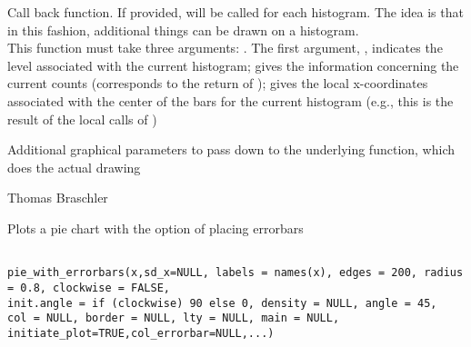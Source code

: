 \documentclass[a4paper]{book}
\begin{document}
\begin{Arguments}
\begin{ldescription}
\item[\code{FUN}] Call back function. If provided, will be called for each histogram. The idea is that in this fashion, additional things can be drawn on a histogram.\\{} This function must take three arguments: . The first argument, , indicates the level associated with the current histogram;  gives the information concerning the current counts (corresponds to the return of );  gives the local x-coordinates associated with the center of the bars for the current histogram (e.g., this is the result of the local calls of )
\item[\code{...}] 
Additional graphical parameters to pass down to the underlying  function, which does the actual drawing

\end{ldescription}
\end{Arguments}
%
\begin{Author}\relax
Thomas Braschler
\end{Author}
%
\begin{Description}\relax
Plots a pie chart with the option of placing errorbars
\end{Description}
%
\begin{Usage}
\begin{verbatim}
	             
pie_with_errorbars(x,sd_x=NULL, labels = names(x), edges = 200, radius = 0.8, clockwise = FALSE, 
init.angle = if (clockwise) 90 else 0, density = NULL, angle = 45, 
col = NULL, border = NULL, lty = NULL, main = NULL, initiate_plot=TRUE,col_errorbar=NULL,...) 
\end{verbatim}
\end{Usage}
%
\end{document}
